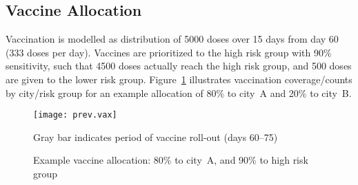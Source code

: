 \subsection{Vaccine Allocation}\label{app.model.vax}
Vaccination is modelled as distribution of 5000 doses over 15 days from day 60 (333 doses per day).
Vaccines are prioritized to the high risk group with 90\% sensitivity, such that
4500 doses actually reach the high risk group, and
500 doses are given to the lower risk group.
Figure~\ref{fig:prev.vax} illustrates vaccination coverage/counts by city/risk group
for an example allocation of 80\% to city~A and 20\% to city~B.
\begin{figure}[h]
  \texttt{[image: prev.vax]}
  \caption{Example vaccine allocation: 80\% to city~A, and 90\% to high risk group}
  \label{fig:prev.vax}
  \floatfoot
  Gray bar indicates period of vaccine roll-out (days 60--75)
\end{figure}

